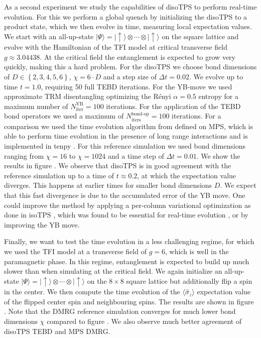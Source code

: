 
As a second experiment we study the capabilities of disoTPS to perform real-time evolution. For this we perform a global quench by initializing the disoTPS to a product state, which we then evolve in time, measuring local expectation values. We start with an all-up-state $|\Psi\rangle = |\uparrow\rangle\otimes\cdots\otimes|\uparrow\rangle$ on the square lattice and evolve with the Hamiltonian of the TFI model at critical transverse field $g \approx 3.04438$. At the critical field the entanglement is expected to grow very quickly, making this a hard problem. For the disoTPS we choose bond dimensions of $D\in\left\{2, 3, 4, 5, 6\right\}$, $\chi = 6\cdot D$ and a step size of $\Delta t = 0.02$. We evolve up to time $t = 1.0$, requiring 50 full TEBD iterations. For the YB-move we used approximate TRM disentangling optimizing the Rényi $\alpha = 0.5$ entropy for a maximum number of $N_\text{iter}^\text{YB} = 100$ iterations. For the application of the TEBD bond operators we used a maximum of $N_\text{iters}^\text{bond-op} = 100$ iterations. For a comparison we used the time evolution algorithm from \cite{cite:time_evolving_a_mps_with_long_range_interactions} defined on MPS, which is able to perform time evolution in the presence of long range interactions and is implemented in tenpy \cite{cite:tenpy}. For this reference simulation we used bond dimensions ranging from $\chi = 16$ to $\chi= 1024$ and a time step of $\Delta t = 0.01$. We show the results in figure . We observe that disoTPS is in good agreement with the reference simulation up to a time of $t\approx0.2$, at which the expectation value diverges. This happens at earlier times for smaller bond dimensions $D$. We expect that this fast divergence is due to the accumulated error of the YB move. One could improve the method by applying a per-column variational optimization as done in isoTPS \cite{cite:isometric_tensor_network_states_in_two_dimensions, cite:efficient_simulation_of_dynamics_in_two_dimensional_quantum_spin_systems}, which was found to be essential for real-time evolution \cite{cite:efficient_simulation_of_dynamics_in_two_dimensional_quantum_spin_systems}, or by improving the YB move. \par

Finally, we want to test the time evolution in a less challenging regime, for which we used the TFI model at a transverse field of $g = 6$, which is well in the paramagnetic phase. In this regime, entanglement is expected to build up much slower than when simulating at the critical field. We again initialize an all-up-state $|\Psi\rangle = |\uparrow\rangle\otimes\cdots\otimes|\uparrow\rangle$ on the $8\times8$ square lattice but additionally flip a spin in the center. We then compute the time evolution of the $\langle\hat{\sigma}_z\rangle$ expectation value of the flipped center spin and neighbouring spins. The results are shown in figure . Note that the DMRG reference simulation converges for much lower bond dimensions $\chi$ compared to figure . We also observe much better agreement of disoTPS TEBD and MPS DMRG.